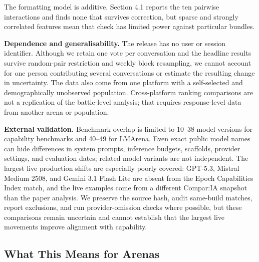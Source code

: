 \documentclass[
]{article}
\newcounter{none} %
\begin{document}
The formatting model is additive. Section 4.1 reports the ten pairwise
interactions and finds none that survives correction, but sparse and
strongly correlated features mean that check has limited power against
particular bundles.

\textbf{Dependence and generalisability.} The release has no user or
session identifier. Although we retain one vote per conversation and
the headline results survive random-pair restriction and weekly block
resampling, we cannot account for one person contributing several
conversations or estimate the resulting change in uncertainty. The data
also come from one platform with a self-selected and demographically
unobserved population. Cross-platform ranking comparisons are not a
replication of the battle-level analysis; that requires response-level
data from another arena or population.

\textbf{External validation.} Benchmark overlap is limited to 10--38
model versions for capability benchmarks and 40--49 for LMArena. Even
exact public model names can hide differences in system prompts,
inference budgets, scaffolds, provider settings, and evaluation dates;
related model variants are not independent. The largest live production
shifts are especially poorly covered: GPT-5.3, Mistral Medium 2508, and
Gemini 3.1 Flash Lite are absent from the Epoch Capabilities Index match,
and the live examples come from a different Compar:IA snapshot than the
paper analysis. We preserve the source hash, audit same-build matches,
report exclusions, and run provider-omission checks where possible, but
these comparisons remain uncertain and cannot establish that the
largest live movements improve alignment with capability.

\subsection{What This Means for
Arenas}\label{implications-for-arena-design}
\end{document}
